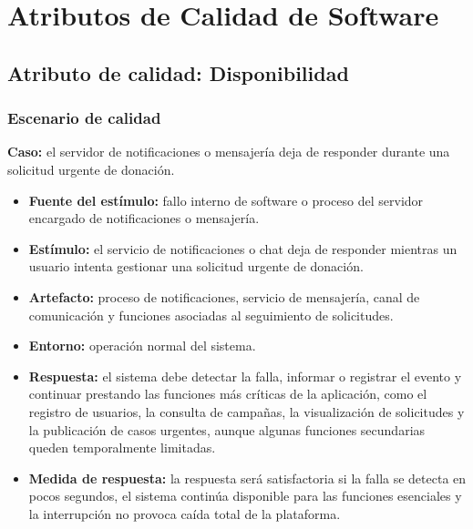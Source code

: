 \section{Atributos de Calidad de Software}

\subsection{Atributo de calidad: Disponibilidad}

\subsubsection{Escenario de calidad}

\textbf{Caso:} el servidor de notificaciones o mensajería deja de responder durante una solicitud urgente de donación.

\begin{itemize}
    \item \textbf{Fuente del estímulo:} fallo interno de software o proceso del servidor encargado de notificaciones o mensajería.
    \item \textbf{Estímulo:} el servicio de notificaciones o chat deja de responder mientras un usuario intenta gestionar una solicitud urgente de donación.
    \item \textbf{Artefacto:} proceso de notificaciones, servicio de mensajería, canal de comunicación y funciones asociadas al seguimiento de solicitudes.
    \item \textbf{Entorno:} operación normal del sistema.
    \item \textbf{Respuesta:} el sistema debe detectar la falla, informar o registrar el evento y continuar prestando las funciones más críticas de la aplicación, como el registro de usuarios, la consulta de campañas, la visualización de solicitudes y la publicación de casos urgentes, aunque algunas funciones secundarias queden temporalmente limitadas.
    \item \textbf{Medida de respuesta:} la respuesta será satisfactoria si la falla se detecta en pocos segundos, el sistema continúa disponible para las funciones esenciales y la interrupción no provoca caída total de la plataforma.
\end{itemize}

